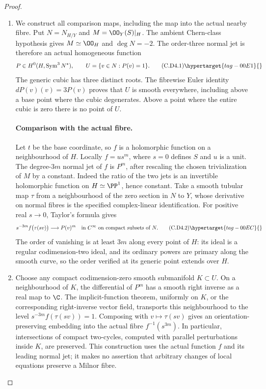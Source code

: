 \begin{proof}

\begin{enumerate}[label={$\langle1\rangle$\arabic*.},leftmargin=*]
\item We construct all comparison maps, including the map into the
actual nearby fibre. Put $N=N_{H/Y}$ and
$M=\OO_Y(S)|_H$. The ambient Chern-class hypothesis gives
$M\simeq\OO_H$ and $\deg N=-2$. The order-three normal jet is
therefore an actual homogeneous function
\[
 P\in H^0(H,\operatorname{Sym}^3N^*),\qquad
 U=\{v\in N:P(v)=1\}.
\tag{C.D4.1}\hypertarget{tag-00E1}{}\label{cdp:eq:C.D4.1}
\]
The generic cubic has three distinct roots. The fibrewise Euler
identity $dP(v)(v)=3P(v)$ proves that $U$ is smooth everywhere,
including above a base point where the cubic degenerates. Above
a point where the entire cubic is zero there is no point of $U$.

\paragraph{Comparison with the actual fibre.}
Let $t$ be the base coordinate, so $f$ is a holomorphic function
on a neighbourhood of $H$. Locally $f=u s^m$, where $s=0$
defines $S$ and $u$ is a unit. The degree-$3m$ normal jet of
$f$ is $P^m$, after rescaling the chosen trivialization of $M$
by a constant. Indeed the ratio of the two jets is an invertible
holomorphic function on $H\simeq\PP^1$, hence constant.
Take a smooth tubular map $\tau$ from a neighbourhood of the
zero section in $N$ to $Y$, whose derivative on normal fibres
is the specified complex-linear identification. For positive
real $s\to0$, Taylor's formula gives
\[
 s^{-3m}f\bigl(\tau(sv)\bigr)\longrightarrow P(v)^m
                 \quad\hbox{in }C^\infty\hbox{ on compact subsets of }N.
\tag{C.D4.2}\hypertarget{tag-00EC}{}\label{cdp:eq:C.D4.2}
\]
The order of vanishing is at least $3m$ along every point of
$H$: its ideal is a regular codimension-two ideal, and its
ordinary powers are primary along the smooth curve, so the
order verified at its generic point extends over $H$.

\item Choose any compact codimension-zero smooth submanifold
$K\subset U$. On a neighbourhood of $K$, the differential of
$P^m$ has a smooth right inverse as a real map to $\C$.
The implicit-function theorem, uniformly on $K$, or the
corresponding right-inverse vector field, transports this
neighbourhood to the level
$s^{-3m}f(\tau(sv))=1$. Composing with $v\mapsto\tau(sv)$
gives an orientation-preserving embedding into the actual
fibre $f^{-1}(s^{3m})$. In particular, intersections of compact
two-cycles, computed with parallel perturbations inside $K$,
are preserved. This construction uses the actual function
$f$ and its leading normal jet; it makes no assertion that
arbitrary changes of local equations preserve a Milnor fibre.


\end{enumerate}
\end{proof}
